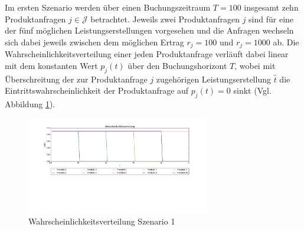 Im ersten Szenario werden über einen Buchungszeitraum $T=100$ insgesamt zehn Produktanfragen $j\in\mathcal{J}$ betrachtet. Jeweils zwei Produktanfragen $j$ sind für eine der fünf möglichen Leistungserstellungen vorgesehen und die Anfragen wechseln sich dabei jeweils zwischen dem möglichen Ertrag $r_j=100$ und $r_j=1000$ ab. Die Wahrscheinlichkeitsverteilung einer jeden Produktanfrage verläuft dabei linear mit dem konstanten Wert $p_j(t)$ über den Buchungshorizont $T$, wobei mit Überschreitung der zur Produktanfrage $j$ zugehörigen Leistungserstellung $\hat t$ die Eintrittswahrscheinlichkeit der Produktanfrage auf $p_j(t)=0$ sinkt (Vgl. Abbildung \ref{SB1}).

\begin{figure}[h!]
  \begin{center}
    \includegraphics[width=80mm, trim=300pt 180pt 300pt 50pt]{SBilder/1.png}
    \caption{Wahrscheinlichkeitsverteilung Szenario 1}  \label{SB1}
  \end{center}
\end{figure}

